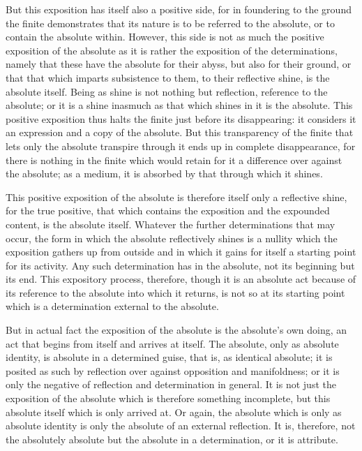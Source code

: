 But this exposition has itself also a positive side,
for in foundering to the ground the finite demonstrates
that its nature is to be referred to the absolute,
or to contain the absolute within.
However, this side is not as much
the positive exposition of the absolute
as it is rather the exposition of the determinations,
namely that these have the absolute for their abyss,
but also for their ground,
or that that which imparts subsistence to them,
to their reflective shine, is the absolute itself.
Being as shine is not nothing but reflection,
reference to the absolute;
or it is a shine inasmuch as
that which shines in it is the absolute.
This positive exposition thus halts the finite
just before its disappearing:
it considers it an expression and
a copy of the absolute.
But this transparency of the finite
that lets only the absolute transpire through it
ends up in complete disappearance,
for there is nothing in the finite
which would retain for it a difference
over against the absolute;
as a medium, it is absorbed by
that through which it shines.

This positive exposition of the absolute is
therefore itself only a reflective shine,
for the true positive, that which contains
the exposition and the expounded content,
is the absolute itself.
Whatever the further determinations that may occur,
the form in which the absolute reflectively shines is
a nullity which the exposition gathers up from outside
and in which it gains for itself a starting point for its activity.
Any such determination has in the absolute,
not its beginning but its end.
This expository process, therefore, though it is an absolute act
because of its reference to the absolute into which it returns,
is not so at its starting point
which is a determination external to the absolute.

But in actual fact the exposition of the absolute is the absolute's own doing,
an act that begins from itself and arrives at itself.
The absolute, only as absolute identity, is absolute in a determined guise,
that is, as identical absolute;
it is posited as such by reflection over against
opposition and manifoldness;
or it is only the negative of reflection and determination in general.
It is not just the exposition of the absolute
which is therefore something incomplete,
but this absolute itself which is only arrived at.
Or again, the absolute which is only as absolute identity is
only the absolute of an external reflection.
It is, therefore, not the absolutely absolute but the
absolute in a determination, or it is attribute.

